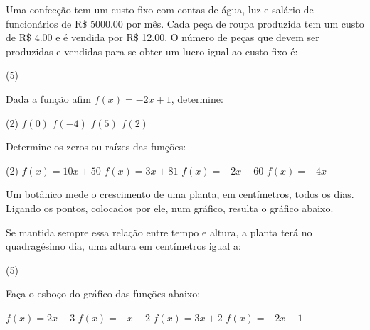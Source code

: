 \documentclass[a4paper,11pt,addpoints]{exam}
\begin{document}
\begin{questions}

	\question[1]

	Uma confecção tem um custo fixo com contas de água, luz e salário de
	funcionários de R\$ 5000.00 por mês. Cada peça de roupa produzida tem
	um custo de R\$ 4.00 e é vendida por R\$ 12.00. O número de peças que
	devem ser produzidas e vendidas para se obter um lucro igual ao custo
	fixo é:

	\begin{tasks}(5)

	\end{tasks}

	\question[1]

	Dada a função afim $f(x) = -2x +1$, determine:

	\begin{tasks}(2)
		\task $f(0)$
		\task $f(-4)$
		\task $f(5)$
		\task $f(2)$
	\end{tasks}

	\question[1]

	Determine os zeros ou raízes das funções:

	\begin{tasks}(2)
		\task $f(x) = 10x + 50$
		\task $f(x) = 3x + 81$
		\task $f(x) = -2x - 60$
		\task $f(x) = -4x$
	\end{tasks}

	\question[1]

	Um botânico mede o crescimento de uma planta, em centímetros, todos os dias.
	Ligando os pontos, colocados por ele, num gráfico, resulta o gráfico abaixo.

	\begin{center}
	\end{center}

	Se mantida sempre essa relação entre tempo e altura, a planta terá no
	quadragésimo dia, uma altura em centímetros igual a:

	\begin{tasks}(5)
	\end{tasks}

	\question[2]

	Faça o esboço do gráfico das funções abaixo:

	\begin{tasks}
		\task $f(x) = 2x - 3$
		\task $f(x) = -x + 2$
		\task $f(x) = 3x + 2$
		\task $f(x) = -2x - 1$
	\end{tasks}

\end{questions}
\end{document}
